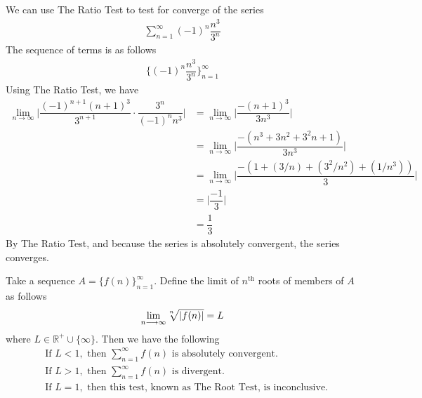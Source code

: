 \begin{example}
We can use The Ratio Test to test for converge of the series
\begin{align*}
    \sum_{n = 1}^{\infty} (-1)^{n} \dfrac{n^{3}}{3^{n}}
\end{align*}
The sequence of terms is as follows
\begin{align*}
    \Big\{(-1)^{n} \dfrac{n^{3}}{3^{n}}\Big\}_{n = 1}^{\infty}
\end{align*}
Using The Ratio Test, we have
\begin{align*}
    \lim_{n \longrightarrow \infty} \Big\lvert \dfrac{(-1)^{n+1}(n+1)^{3}}{3^{n+1}} \cdot \dfrac{3^{n}}{(-1)^{n}n^{3}} \Big\rvert &= \lim_{n \longrightarrow \infty} \Big\lvert \dfrac{-(n+1)^{3}}{3n^{3}} \Big\rvert\\[2ex]
    &= \lim_{n \longrightarrow \infty} \Big\lvert \dfrac{-(n^{3} + 3n^{2} + 3^{2}n + 1)}{3n^{3}} \Big\rvert\\[2ex]
    &= \lim_{n \longrightarrow \infty} \Big\lvert \dfrac{-(1 + (3/n) + (3^{2}/n^{2}) + (1/n^{3}))}{3} \Big\rvert\\[2ex]
    &= \Big\lvert \dfrac{-1}{3} \Big\rvert\\[2ex]
    &= \dfrac{1}{3}
\end{align*}
By The Ratio Test, and because the series is absolutely convergent, the series converges. 
\end{example}

\begin{theorem}
Take a sequence $A = \{f(n)\}_{n = 1}^{\infty}$. Define the limit of $n^{\text{th}}$ roots of members of $A$ as follows
\begin{align*}
    \lim_{n \longrightarrow \infty} \sqrt[\leftroot{2}\uproot{2}n]{\lvert f(n) \rvert} = L
\end{align*}
where $L \in \mathbb{R^{+}} \cup \{\infty\}$. Then we have the following
\begin{align*}
    &\text{If} \hspace{4pt} L < 1, \hspace{4pt} \text{then} \hspace{4pt} \sum_{n = 1}^{\infty} f(n) \hspace{4pt} \text{is absolutely convergent.}\\[2ex]
    &\text{If} \hspace{4pt} L > 1, \hspace{4pt} \text{then} \hspace{4pt} \sum_{n = 1}^{\infty} f(n) \hspace{4pt} \text{is divergent.}\\[2ex]
    &\text{If} \hspace{4pt} L = 1, \hspace{4pt} \text{then this test, known as The Root Test, is inconclusive.}
\end{align*}
\end{theorem}

